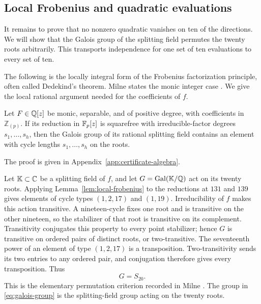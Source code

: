 \subsection{Local Frobenius and quadratic evaluations}

It remains to prove that no nonzero quadratic vanishes on ten of the
directions.  We will show that the Galois group of the splitting field
permutes the twenty roots arbitrarily.  This transports independence for
one set of ten evaluations to every set of ten.

The following is the locally integral form of the Frobenius
factorization principle, often called Dedekind's theorem.  Milne states
the monic integer case \cite[Theorem 4.28]{Milne2022}.  We give the local
rational argument needed for the coefficients of $f$.

\begin{lemma}\label{lem:local-frobenius}
Let $F\in\mathbb Q[z]$ be monic, separable, and of positive degree, with
coefficients in $\mathbb Z_{(p)}$.  If its reduction in $\mathbb F_p[z]$ is
squarefree with irreducible-factor degrees $s_1,\ldots,s_h$, then the
Galois group of its rational splitting field contains an element with
cycle lengths $s_1,\ldots,s_h$ on the roots.
\end{lemma}

The proof is given in Appendix~\ref{app:certificate-algebra}.

Let $\mathbb K\subset\mathbb C$ be a splitting field of $f$, and let
$G=\operatorname{Gal}(\mathbb K/\mathbb Q)$ act on its twenty roots.  Applying
Lemma~\ref{lem:local-frobenius} to the reductions at $131$ and $139$
gives elements of cycle types $(1,2,17)$ and $(1,19)$.  Irreducibility
of $f$ makes this action transitive.  A nineteen-cycle fixes one root and
is transitive on the other nineteen, so the stabilizer of that root is
transitive on its complement.  Transitivity conjugates this property to
every point stabilizer; hence $G$ is transitive on ordered pairs of
distinct roots, or two-transitive.  The seventeenth power of an element
of type $(1,2,17)$
is a transposition.  Two-transitivity sends its two entries to any
ordered pair, and conjugation therefore gives every transposition.  Thus
\begin{equation}
 G=S_{20}.
 \label{eq:galois-group}
\end{equation}
This is the elementary permutation criterion recorded in
Milne \cite[Lemma 4.31]{Milne2022}.  The group in
\eqref{eq:galois-group} is the splitting-field group acting on the
twenty roots.

